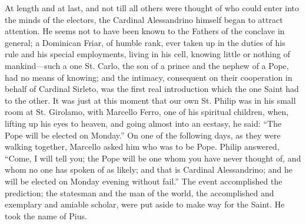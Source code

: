 At length and at last, and not
till all others were thought of who could enter into the minds of the
electors, the Cardinal Alessandrino himself began to attract
attention. He seems not to have been known to the Fathers of the
conclave in general; a Dominican Friar, of humble rank, ever taken up
in the duties of his rule and his special employments, living in his
cell, knowing little or nothing of mankind—such a one St. Carlo, the
son of a prince and the nephew of a Pope, had no means of knowing; and
the intimacy, consequent on their cooperation in behalf of Cardinal
Sirleto, was the first real introduction which the one Saint had to
the other. It was just at this moment that our own St. Philip was in
his small room at St. Girolamo, with Marcello Ferro, one of his
spiritual children, when, lifting up his eyes to heaven, and going
almost into an ecstasy, he said: ``The Pope will be elected on Monday.''
On one of the following days, as they were walking together, Marcello asked him who was to be Pope. Philip answered, ``Come, I will
tell you; the Pope will be one whom you have never thought of, and
whom no one has spoken of as likely; and that is Cardinal Alessandrino;
and he will be elected on Monday evening without fail.'' The event
accomplished the prediction; the statesman and the man of the world,
the accomplished and exemplary and amiable scholar, were put aside to
make way for the Saint. He took the name of Pius.

